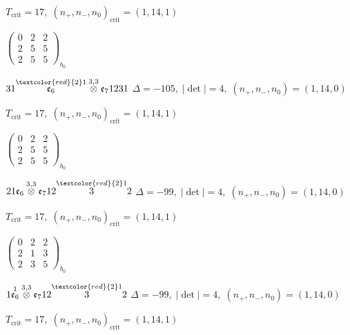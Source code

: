 \documentclass[10pt]{article}
\begin{document}
\hspace{1em}$T_{\text{crit}}=17,\; (n_+,n_-,n_0)_{\text{crit}}=(1,14,1)$

\hspace{2em}$\left(\begin{smallmatrix}0 & 2 & 2 \\ 2 & 5 & 5 \\ 2 & 5 & 5\end{smallmatrix}\right)_{\!b_0}$

\smallskip

$31\overset{\textcolor{red}{2}1}{\mathfrak{e}_6}\overset{3,3}{\otimes}\mathfrak{e}_71231$ \quad $\Delta=-105,\; |\det|=4,\; (n_+,n_-,n_0)=(1,14,0)$

\hspace{1em}$T_{\text{crit}}=17,\; (n_+,n_-,n_0)_{\text{crit}}=(1,14,1)$

\hspace{2em}$\left(\begin{smallmatrix}0 & 2 & 2 \\ 2 & 5 & 5 \\ 2 & 5 & 5\end{smallmatrix}\right)_{\!b_0}$

\smallskip

$21\mathfrak{e}_6\overset{3,3}{\otimes}\mathfrak{e}_712\overset{\textcolor{red}{2}1}{3}2$ \quad $\Delta=-99,\; |\det|=4,\; (n_+,n_-,n_0)=(1,14,0)$

\hspace{1em}$T_{\text{crit}}=17,\; (n_+,n_-,n_0)_{\text{crit}}=(1,14,1)$

\hspace{2em}$\left(\begin{smallmatrix}0 & 2 & 2 \\ 2 & 1 & 3 \\ 2 & 3 & 5\end{smallmatrix}\right)_{\!b_0}$

\smallskip

$1\overset{1}{\mathfrak{e}_6}\overset{3,3}{\otimes}\mathfrak{e}_712\overset{\textcolor{red}{2}1}{3}2$ \quad $\Delta=-99,\; |\det|=4,\; (n_+,n_-,n_0)=(1,14,0)$

\hspace{1em}$T_{\text{crit}}=17,\; (n_+,n_-,n_0)_{\text{crit}}=(1,14,1)$
\end{document}
